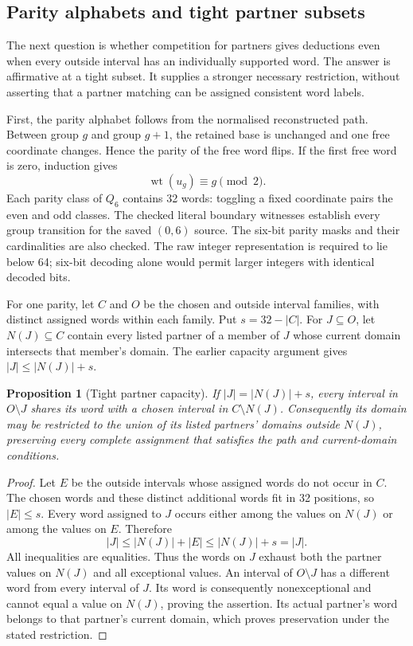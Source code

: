 \documentclass[11pt,a4paper]{article}
\newtheorem{proposition}[theorem]{Proposition}
\theoremstyle{definition}
\theoremstyle{remark}
\begin{document}
\subsection{Parity alphabets and tight partner subsets}
\label{sec:tight214}
The next question is whether competition for partners gives deductions
even when every outside interval has an individually supported word.
The answer is affirmative at a tight subset. It supplies a stronger
necessary restriction, without asserting that a partner matching can
be assigned consistent word labels.

First, the parity alphabet follows from the normalised reconstructed
path. Between group $g$ and group $g+1$, the retained base is unchanged
and one free coordinate changes. Hence the parity of the free word
flips. If the first free word is zero, induction gives
\[
\operatorname{wt}(u_g)\equiv g\pmod 2.
\]
Each parity class of $Q_6$ contains 32 words: toggling a fixed coordinate
pairs the even and odd classes. The checked literal boundary witnesses
establish every group transition for the saved $(0,6)$ source. The
six-bit parity masks and their cardinalities are also checked.
The raw integer representation is required to lie below 64; six-bit
decoding alone would permit larger integers with identical decoded bits.

For one parity, let $C$ and $O$ be the chosen and outside interval
families, with distinct assigned words within each family. Put
$s=32-|C|$. For $J\subseteq O$, let $N(J)\subseteq C$ contain every
listed partner of a member of $J$ whose current domain intersects that
member's domain. The earlier capacity argument gives
$|J|\le |N(J)|+s$.

\begin{proposition}[Tight partner capacity]\label{prop:tight214}
If $|J|=|N(J)|+s$, every interval in $O\setminus J$ shares its word
with a chosen interval in $C\setminus N(J)$. Consequently its domain
may be restricted to the union of its listed partners' domains outside
$N(J)$, preserving every complete assignment that satisfies the path
and current-domain conditions.
\end{proposition}
\begin{proof}
Let $E$ be the outside intervals whose assigned words do not occur in
$C$. The chosen words and these distinct additional words fit in 32
positions, so $|E|\le s$. Every word assigned to $J$ occurs either
among the values on $N(J)$ or among the values on $E$. Therefore
\[
|J|\le |N(J)|+|E|\le |N(J)|+s=|J|.
\]
All inequalities are equalities. Thus the words on $J$ exhaust both
the partner values on $N(J)$ and all exceptional values. An interval
of $O\setminus J$ has a different word from every interval of $J$.
Its word is consequently nonexceptional and cannot equal a value on
$N(J)$, proving the assertion. Its actual partner's word belongs to
that partner's current domain, which proves preservation under the
stated restriction.
\end{proof}
\end{document}
